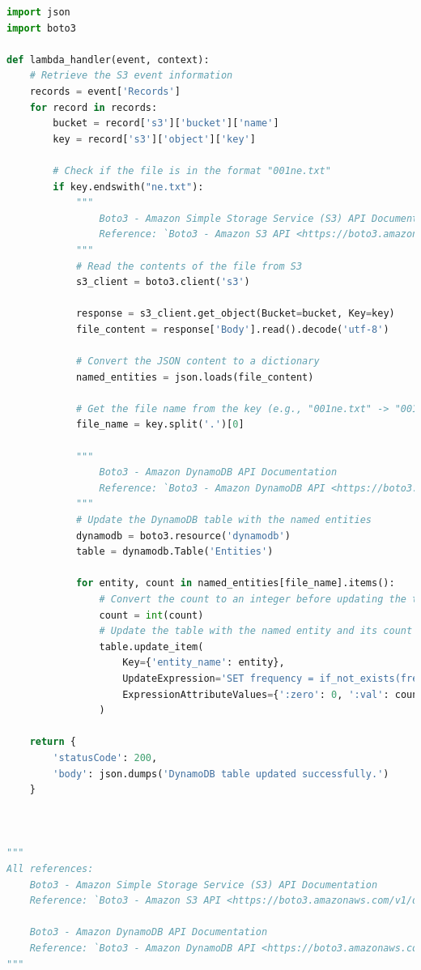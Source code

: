 \begin{mdframed}[linewidth=1pt]
\lstset{style=mystyle}
\begin{lstlisting}[language=Python]
import json
import boto3

def lambda_handler(event, context):
    # Retrieve the S3 event information
    records = event['Records']
    for record in records:
        bucket = record['s3']['bucket']['name']
        key = record['s3']['object']['key']
        
        # Check if the file is in the format "001ne.txt"
        if key.endswith("ne.txt"):
            """
                Boto3 - Amazon Simple Storage Service (S3) API Documentation
                Reference: `Boto3 - Amazon S3 API <https://boto3.amazonaws.com/v1/documentation/api/latest/reference/services/s3.html>`_
            """
            # Read the contents of the file from S3            
            s3_client = boto3.client('s3')

            response = s3_client.get_object(Bucket=bucket, Key=key)
            file_content = response['Body'].read().decode('utf-8')
            
            # Convert the JSON content to a dictionary
            named_entities = json.loads(file_content)
            
            # Get the file name from the key (e.g., "001ne.txt" -> "001ne")
            file_name = key.split('.')[0]
            
            """
                Boto3 - Amazon DynamoDB API Documentation
                Reference: `Boto3 - Amazon DynamoDB API <https://boto3.amazonaws.com/v1/documentation/api/latest/reference/services/dynamodb.html>`_
            """
            # Update the DynamoDB table with the named entities
            dynamodb = boto3.resource('dynamodb')
            table = dynamodb.Table('Entities')
            
            for entity, count in named_entities[file_name].items():
                # Convert the count to an integer before updating the table
                count = int(count)
                # Update the table with the named entity and its count
                table.update_item(
                    Key={'entity_name': entity},
                    UpdateExpression='SET frequency = if_not_exists(frequency, :zero) + :val',
                    ExpressionAttributeValues={':zero': 0, ':val': count}
                )
                
    return {
        'statusCode': 200,
        'body': json.dumps('DynamoDB table updated successfully.')
    }



"""
All references:
    Boto3 - Amazon Simple Storage Service (S3) API Documentation
    Reference: `Boto3 - Amazon S3 API <https://boto3.amazonaws.com/v1/documentation/api/latest/reference/services/s3.html>`_

    Boto3 - Amazon DynamoDB API Documentation
    Reference: `Boto3 - Amazon DynamoDB API <https://boto3.amazonaws.com/v1/documentation/api/latest/reference/services/dynamodb.html>`_
"""

\end{lstlisting}
\end{mdframed}

